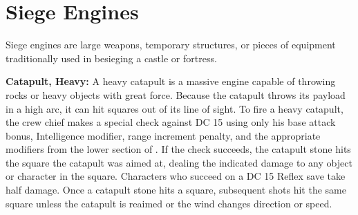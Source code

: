 \section{Siege Engines}
Siege engines are large weapons, temporary structures, or pieces of equipment traditionally used in besieging a castle or fortress.



\textbf{Catapult, Heavy:} A heavy catapult is a massive engine capable of throwing rocks or heavy objects with great force. Because the catapult throws its payload in a high arc, it can hit squares out of its line of sight. To fire a heavy catapult, the crew chief makes a special check against DC 15 using only his base attack bonus, Intelligence modifier, range increment penalty, and the appropriate modifiers from the lower section of . If the check succeeds, the catapult stone hits the square the catapult was aimed at, dealing the indicated damage to any object or character in the square. Characters who succeed on a DC 15 Reflex save take half damage. Once a catapult stone hits a square, subsequent shots hit the same square unless the catapult is reaimed or the wind changes direction or speed.

